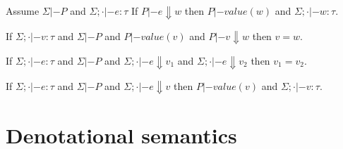 \documentclass[preprint,nocopyrightspace]{sigplanconf}
\begin{document}
\begin{lemma}
Assume $\Sigma |- P$ and $\Sigma;\cdot |- e : \tau$
If $P |- e \Downarrow w$ then $P |- value(w)$ and $\Sigma;\cdot |- w : \tau$.
\end{lemma}



\newcommand{\lcf}[1]{\textsf{cf}(#1)}
\newcommand{\lcfZ}{\textsf{cf}}
\newcommand{\lncf}[1]{\neg\textsf{cf}(#1)}
\newcommand{\unr}{\mathop{unr}}
\newcommand{\bad}{\mathop{bad}}
\newcommand{\sel}[2]{\mathop{sel\_#1\!\_#2}}
\newcommand{\ctrans}[3]{{\cal C}[\![#3]\!]_{#2}^{#1}}
\newcommand{\etrans}[3]{{\cal E}[\![#3]\!]_{#2}^{#1}}
\newcommand{\utrans}[3]{{\cal U}[\![#3]\!]_{#2}^{#1}}
\newcommand{\dtrans}[2]{{\cal D}[\![#2]\!]^{#1}}
\newcommand{\Dtrans}[2]{{\cal D}[\![#2]\!]^{#1}}
\newcommand{\roll}{\mathsf{roll}}
\newcommand{\unroll}{\mathsf{unroll}}
\newcommand{\bind}{\mathsf{bind}}
\newcommand{\ret}{\mathsf{ret}}
\newcommand{\dlambda}{\mathsf{\lambda}}
\newcommand{\curry}{\mathsf{curry}}
\newcommand{\eval}{\mathsf{eval}}
\newcommand{\uncurry}{\mathsf{incurry}}
\newcommand{\dapp}{\mathsf{app}}
\newcommand{\inj}[1]{\mathsf{inj}_{#1}}

\begin{lemma}
If $\Sigma;\cdot |- v : \tau$ and 
$\Sigma |- P$ and $P |- value(v)$ and $P |- v \Downarrow w$ then $ v = w $.
\end{lemma}

\begin{lemma}
If $\Sigma;\cdot |- e : \tau$ and 
$\Sigma |- P$ and $\Sigma;\cdot |- e \Downarrow v_1$ and $\Sigma;\cdot |- e \Downarrow v_2$ then
$v_1 = v_2$.
\end{lemma}

\begin{lemma}
If $\Sigma;\cdot |- e : \tau$ and 
$\Sigma |- P$ and $\Sigma;\cdot |- e \Downarrow v$ then $P |- value(v)$ and $\Sigma;\cdot |- v : \tau$.
\end{lemma}


\section{Denotational semantics}
\newcommand{\unitcpo}{{\sf{\bf 1}}}
\end{document}
